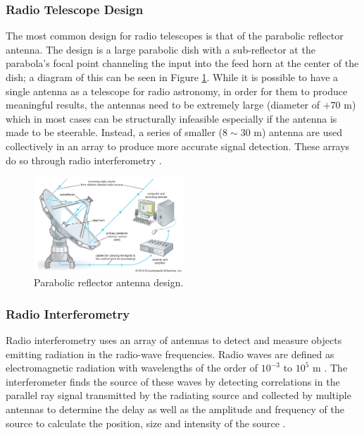 \subsubsection{Radio Telescope Design}
The most common design for radio telescopes is that of the parabolic reflector antenna. The design is a large parabolic dish with a sub-reflector at the parabola's focal point channeling the input into the feed horn at the center of the dish; a diagram of this can be seen in Figure \ref{ra:fig:para}. While it is possible to have a single antenna as a telescope for radio astronomy, in order for them to produce meaningful results, the antennas need to be extremely large (diameter of $+70$ m) which in most cases can be structurally infeasible especially if the antenna is made to be steerable. Instead, a series of smaller ($8\sim30$ m) antenna are used collectively in an array to produce more accurate signal detection. These arrays do so through radio interferometry \citep{cheng2009radio}.
%
\begin{figure}[H]
	\centering
	\includegraphics[width=0.5\textwidth]{Images/Telescope.jpg}
	\caption[]{Parabolic reflector antenna design\footnotemark.}
	\label{ra:fig:para}
\end{figure}
%
\subsubsection{Radio Interferometry}\label{ra:ssec:des}
Radio interferometry uses an array of antennas to detect and measure objects emitting radiation in the radio-wave frequencies. Radio waves are defined as electromagnetic radiation with wavelengths of the order of $10^{-3}$ to $10^5$ m \citep{cheng2009radio}. The interferometer finds the source of these waves by detecting correlations in the parallel ray signal transmitted by the radiating source \citep{tasse2016tessellation} and collected by multiple antennas to determine the delay as well as the amplitude and frequency of the source to calculate the position, size and intensity of the source \citep{thompson2008interferometry}.
%
